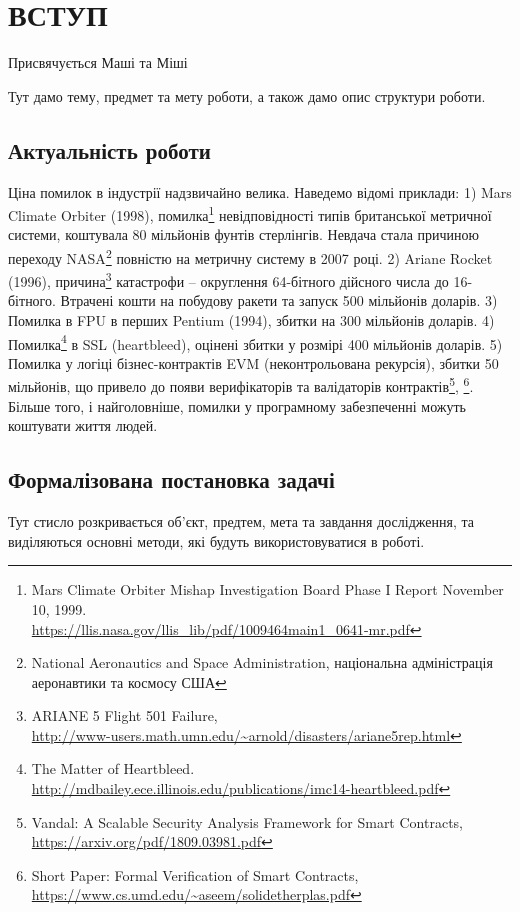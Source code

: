 \chapter*{ВСТУП}

\epigraph{Присвячується Маші та Міші}{}

Тут дамо тему, предмет та мету роботи, а також дамо опис структури роботи.

\section{Актуальність роботи}
Ціна помилок в індустрії надзвичайно велика. Наведемо відомі приклади:
1) Mars Climate Orbiter (1998),
   помилка\footnote{Mars Climate Orbiter Mishap Investigation Board Phase I Report November 10, 1999. \\
                    \url{https://llis.nasa.gov/llis_lib/pdf/1009464main1_0641-mr.pdf}}
   невідповідності типів британської метричної системи, коштувала 80 мільйонів фунтів стерлінгів.
   Невдача стала причиною переходу
   NASA\footnote{National Aeronautics and Space Administration, національна адміністрація аеронавтики та космосу США}
   повністю на метричну систему в 2007 році.
2) Ariane Rocket (1996),
   причина\footnote{ARIANE 5 Flight 501 Failure, \\
          \url{http://www-users.math.umn.edu/~arnold/disasters/ariane5rep.html}}
   катастрофи -- округлення 64-бітного дійсного числа до 16-бітного.
   Втрачені кошти на побудову ракети та запуск 500 мільйонів доларів.
3) Помилка в FPU в перших Pentium (1994), збитки на 300 мільйонів доларів.
4) Помилка\footnote{The Matter of Heartbleed. \\
                    \url{http://mdbailey.ece.illinois.edu/publications/imc14-heartbleed.pdf}}
   в SSL (heartbleed), оцінені збитки у розмірі 400 мільйонів доларів.
5) Помилка у логіці бізнес-контрактів EVM (неконтрольована рекурсія), збитки 50 мільйонів,
   що привело до появи верифікаторів та валідаторів
   контрактів\footnote{Vandal: A Scalable Security Analysis Framework for Smart Contracts, \\
                       \url{https://arxiv.org/pdf/1809.03981.pdf}},
             \footnote{Short Paper: Formal Verification of Smart Contracts, \\
                       \url{https://www.cs.umd.edu/~aseem/solidetherplas.pdf}}.
Більше того, і найголовніше, помилки у програмному забезпеченні можуть коштувати життя людей.

\section{Формалізована постановка задачі}
Тут стисло розкривається об'єкт, предтем, мета та завдання дослідження,
та виділяються основні методи, які будуть використовуватися в роботі.

